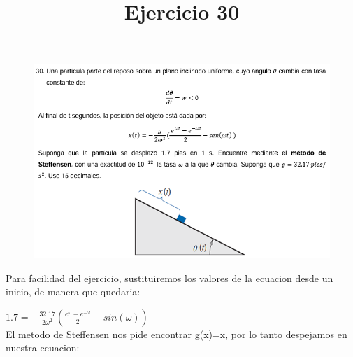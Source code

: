 \documentclass{article}
\title{Ejercicio 30}
\theoremstyle{mytheoremstyle}
\theoremstyle{mytheoremstyle}
\theoremstyle{myproblemstyle}
\begin{document}
\begin{figure}[ht]
    \includegraphics[scale=0.9]{img/stf30_1.png}
\end{figure}
Para facilidad del ejercicio, sustituiremos los valores de la ecuacion desde un inicio, de manera que quedaria:

$1.7=-\frac{32.17}{2\omega^2}(\frac{e^{\omega}-e^{-\omega}}{2}-sin(\omega))$
\noindent \\El metodo de Steffensen nos pide encontrar g(x)=x, por lo tanto despejamos en nuestra ecuacion:
\end{document}

